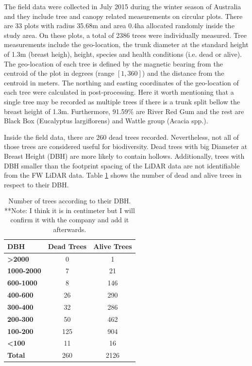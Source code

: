 \documentclass{subfiles}
\begin{document}
\par The field data were collected in July 2015 during the winter season of Australia and they include tree and canopy related measurements on circular plots. There are 33 plots with radius 35.68m and area 0.4ha  allocated randomly inside the study area. On these plots, a total of 2386 trees were individually measured.  Tree measurements include the geo-location, the trunk diameter at the standard height of 1.3m (breast heigh), height, species and health conditions (i.e. dead or alive). The geo-location of each tree is defined by the magnetic bearing from the centroid of the plot in degrees (range $[1,360]$) and the distance from the centroid in meters. The northing and easting coordinates of the geo-location of each tree were calculated in post-processing. Here it worth mentioning that a single tree may be recorded as multiple trees if there is a trunk split bellow the breast height of 1.3m. Furthermore, 91.59\% are River Red Gum and the rest are Black Box (Eucalyptus largiflorens) and Wattle group (Acacia spp.).

\par Inside the field data, there are 260 dead trees recorded. Nevertheless, not all of those trees are considered useful for biodiversity. Dead trees with big Diameter at Breast Height (DBH) are more likely to contain hollows. Additionally, trees with DBH smaller than the footprint spacing of the LiDAR data are not identifiable from the FW LiDAR data. Table \ref{tab:DBH} shows the number of dead and alive trees in respect to their DBH. 

\begin{table}[!h]
	\centering
	\begin{tabular}{| l || c | c | }
		\hline		
		\textbf{DBH} &\textbf{Dead Trees} & \textbf{Alive Trees }\\	
		\hline			
		\hline			
		\textbf{>2000} & 0 & 1\\
		\hline			
		\textbf{1000-2000} & 7 & 21\\
		\hline			
		\textbf{600-1000} & 8 & 146\\
		\hline			
		\textbf{400-600} & 26 & 290\\
		\hline			
		\textbf{300-400} & 32 & 286\\
		\hline			
		\textbf{200-300} & 50 & 462\\
		\hline			
		\textbf{100-200} &125 & 904\\
		\hline			
		\textbf{<100} & 11 & 16\\
		\hline			
		\textbf{Total} & 260 & 2126 \\
		
		
		
		
		\hline  
	\end{tabular}
	\caption{Number of trees according to their DBH. {\color{red}**Note: I think it is in centimeter but I will confirm it with the company and add it afterwards. }}
	\label{tab:DBH}
\end{table}
\end{document}
